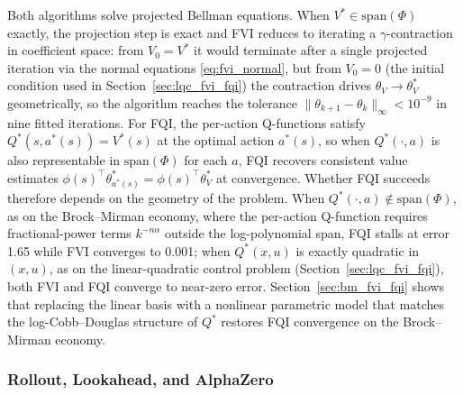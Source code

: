 Both algorithms solve projected Bellman equations. When $V^* \in \mathrm{span}(\Phi)$ exactly, the projection step is exact and FVI reduces to iterating a $\gamma$-contraction in coefficient space: from $V_0 = V^*$ it would terminate after a single projected iteration via the normal equations \eqref{eq:fvi_normal}, but from $V_0 = 0$ (the initial condition used in Section~\ref{sec:lqc_fvi_fqi}) the contraction drives $\theta_V \to \theta_V^*$ geometrically, so the algorithm reaches the tolerance $\|\theta_{k+1} - \theta_k\|_\infty < 10^{-9}$ in nine fitted iterations. For FQI, the per-action Q-functions satisfy $Q^*(s, a^*(s)) = V^*(s)$ at the optimal action $a^*(s)$, so when $Q^*(\cdot, a)$ is also representable in $\mathrm{span}(\Phi)$ for each $a$, FQI recovers consistent value estimates $\phi(s)^\top \theta_{a^*(s)}^* = \phi(s)^\top \theta_V^*$ at convergence. Whether FQI succeeds therefore depends on the geometry of the problem. When $Q^*(\cdot, a) \notin \mathrm{span}(\Phi)$, as on the Brock--Mirman economy, where the per-action Q-function requires fractional-power terms $k^{-n\alpha}$ outside the log-polynomial span, FQI stalls at error 1.65 while FVI converges to 0.001; when $Q^*(x,u)$ is exactly quadratic in $(x,u)$, as on the linear-quadratic control problem (Section~\ref{sec:lqc_fvi_fqi}), both FVI and FQI converge to near-zero error. Section~\ref{sec:bm_fvi_fqi} shows that replacing the linear basis with a nonlinear parametric model that matches the log-Cobb--Douglas structure of $Q^*$ restores FQI convergence on the Brock--Mirman economy.


\subsubsection{Rollout, Lookahead, and AlphaZero}

